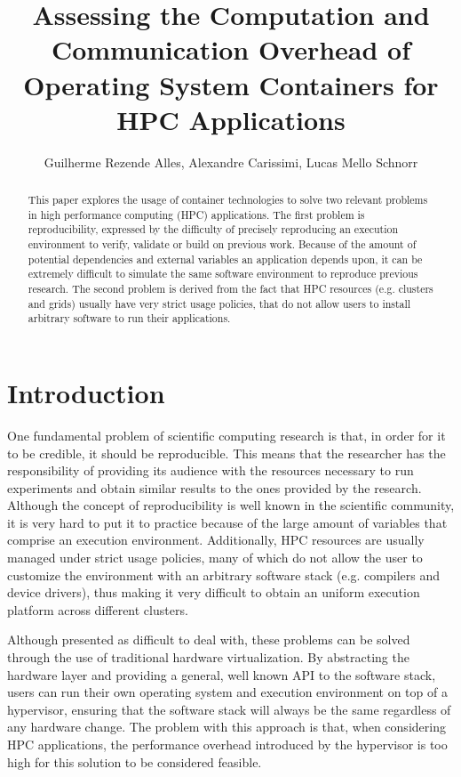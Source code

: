 \documentclass[12pt]{article}
\title{Assessing the Computation and Communication Overhead of Operating System Containers for HPC Applications}
\author{Guilherme Rezende Alles, Alexandre Carissimi, Lucas Mello Schnorr}
\begin{document}
 

\maketitle

\begin{abstract}
  This paper explores the usage of container technologies to solve two relevant problems in high performance computing (HPC) applications. The first problem is reproducibility, expressed by the difficulty of precisely reproducing an execution environment to verify, validate or build on previous work. Because of the amount of potential dependencies and external variables an application depends upon, it can be extremely difficult to simulate the same software environment to reproduce previous research. The second problem is derived from the fact that HPC resources (e.g. clusters and grids) usually have very strict usage policies, that do not allow users to install arbitrary software to run their applications.
\end{abstract}

\section{Introduction}
One fundamental problem of scientific computing research is that, in order for it to be credible, it should be reproducible. This means that the researcher has the responsibility of providing its audience with the resources necessary to run experiments and obtain similar results to the ones provided by the research. Although the concept of reproducibility is well known in the scientific community, it is very hard to put it to practice because of the large amount of variables that comprise an execution environment. Additionally, HPC resources are usually managed under strict usage policies, many of which do not allow the user to customize the environment with an arbitrary software stack (e.g. compilers and device drivers), thus making it very difficult to obtain an uniform execution platform across different clusters.

Although presented as difficult to deal with, these problems can be solved through the use of traditional hardware virtualization. By abstracting the hardware layer and providing a general, well known API to the software stack, users can run their own operating system and execution environment on top of a hypervisor, ensuring that the software stack will always be the same regardless of any hardware change. The problem with this approach is that, when considering HPC applications, the performance overhead introduced by the hypervisor is too high for this solution to be considered feasible.
\end{document}
